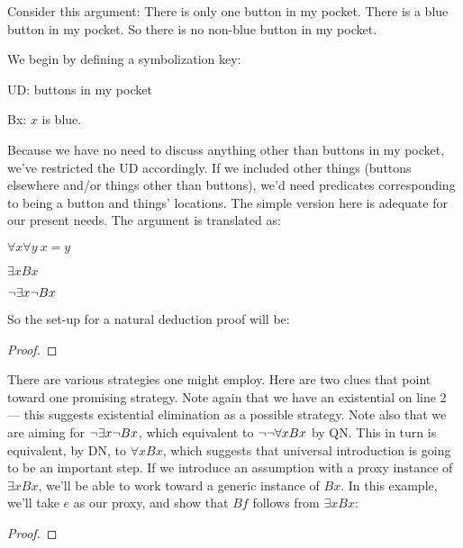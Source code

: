 Consider this argument: There is only one button in my pocket. There is a blue button in my pocket. So there is no non-blue button in my pocket.

We begin by defining a symbolization key:
\begin{ekey}
\item{UD:} buttons in my pocket
\item{Bx:} $x$ is blue.
\end{ekey}
Because we have no need to discuss anything other than buttons in my pocket, we've restricted the UD accordingly. If we included other things (buttons elsewhere and/or things other than buttons), we'd need predicates corresponding to being a button and things' locations. The simple version here is adequate for our present needs. The argument is translated as:
\begin{earg}
\item{} $\forall x \forall y\ x{=}y$
\item{} $\exists x Bx$
\item{\therefore} $\neg \exists x \neg Bx$
\end{earg}

So the set-up for a natural deduction proof will be:

\begin{proof}
	 
	\have{}{}{}
\end{proof}

There are various strategies one might employ. Here are two clues that point toward one promising strategy. Note again that we have an existential on line 2 --- this suggests existential elimination as a possible strategy. Note also that we are aiming for $\neg \exists x \neg Bx$, which equivalent to $\neg \neg \forall x Bx$ by QN. This in turn is equivalent, by DN, to $\forall x Bx$, which suggests that universal introduction is going to be an important step. If we introduce an assumption with a proxy instance of $\exists x Bx$, we'll be able to work toward a generic instance of $Bx$. In this example, we'll take $e$ as our proxy, and show that $Bf$ follows from $\exists x Bx$:

\begin{proof}
	 
	\open
	\close
\end{proof}

